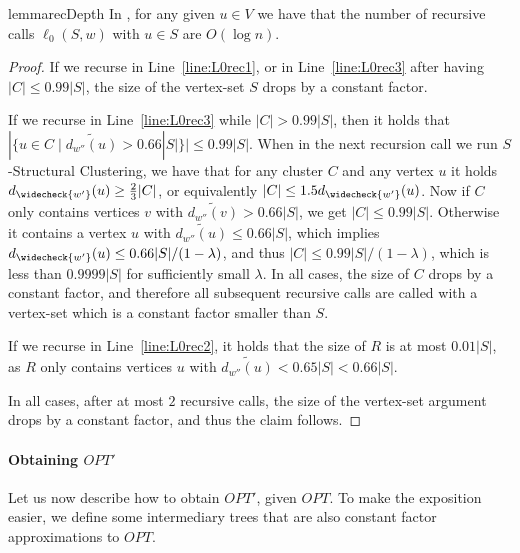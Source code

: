 \documentclass{article}
\newcommand{\set}[1]{\{#1\}}
\begin{document}
\begin{restatable}{lemma}{recDepth}\label{lem:recDepth}
In , for any given $u\in V$ we have that the number of recursive calls \textsc{$\ell_0(S, w)$} with $u\in S$ are $O(\log{n})$.
\end{restatable}
\begin{proof}
If we recurse in Line~\ref{line:L0rec1}, or in Line~\ref{line:L0rec3} after having $|C| \le 0.99|S|$, the size of the vertex-set $S$ drops by a constant factor.

If we recurse in Line~\ref{line:L0rec3} while $|C| > 0.99|S|$, then it holds that $|\set{u\in C \mid \widetilde{d_{w''}(u)} > 0.66 |S|}| \le 0.99|S|$.
When in the next recursion call we run $S$-Structural Clustering, we have that for any cluster $C$ and any vertex $u$ it holds $d_{\widecheck{w'}}(u) \ge \frac{2}{3} |C|$, or equivalently $|C| \le 1.5 d_{\widecheck{w'}}(u)$.
Now if $C$ only contains vertices $v$ with $\widetilde{d_{w''}(v)} > 0.66 |S|$, we get $|C| \le 0.99|S|$.
Otherwise it contains a vertex $u$ with $\widetilde{d_{w''}(u)} \le 0.66 |S|$, which implies $d_{\widecheck{w'}}(u) \le 0.66|S| / (1-\lambda)$, and thus $|C| \le 0.99|S| / (1-\lambda)$, which is less than $0.9999|S|$ for sufficiently small $\lambda$.
In all cases, the size of $C$ drops by a constant factor, and therefore all subsequent recursive calls are called with a vertex-set which is a constant factor smaller than $S$.

If we recurse in Line~\ref{line:L0rec2}, it holds that the size of $R$ is at most $0.01|S|$, as $R$ only contains vertices $u$ with $\widetilde{d_{w''}(u)} < 0.65 |S| < 0.66 |S|$.

In all cases, after at most $2$ recursive calls, the size of the vertex-set argument drops by a constant factor, and thus the claim follows.
\end{proof}

\paragraph*{Obtaining $OPT'$} Let us now describe how to obtain $OPT'$, given $OPT$.
To make the exposition easier, we define some intermediary trees that are also constant factor approximations to $OPT$.
\end{document}
